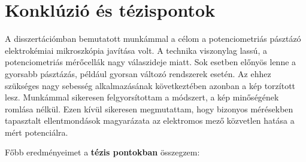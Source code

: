 \section{Konklúzió és tézispontok}
A disszertációmban bemutatott munkámmal a célom a potenciometriás pásztázó elektrokémiai mikroszkópia javítása volt.
A technika viszonylag lassú, a potenciometriás mérőcellák nagy válaszideje miatt.
Sok esetben előnyös lenne a gyorsabb pásztázás, például gyorsan változó rendszerek esetén.
Az ehhez szükséges nagy sebesség alkalmazásának következtében azonban a kép torzított lesz.
Munkámmal sikeresen felgyorsítottam a módszert, a kép minőségének romlása nélkül.
Ezen kívül sikeresen megmutattam, hogy bizonyos mérésekben tapasztalt ellentmondások magyarázata az elektromos mező közvetlen hatása a mért potenciálra.

Főbb eredményeimet a \textbf{tézis pontokban} összegzem:

